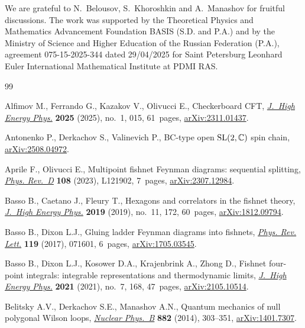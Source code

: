 \documentclass[10pt,a4paper]{amsart}
\numberwithin{equation}{section}
\begin{document}
We are grateful to N.~Belousov, S.~Khoroshkin and A.~Manashov for fruitful discussions.
The work was supported by the
Theoretical Physics and Mathematics Advancement Foundation BASIS (S.D. and P.A.) and by the Ministry of Science and Higher Education of the Russian Federation (P.A.), agreement 075-15-2025-344 dated 29/04/2025 for Saint Petersburg Leonhard Euler International Mathematical Institute at PDMI RAS.


\begin{thebibliography}{99}
\footnotesize\itemsep=0pt

Alfimov M., Ferrando G., Kazakov V., Olivucci E., Checkerboard {CFT},
 \href{https://doi.org/10.1007/jhep01(2025)015}{\textit{J.~High Energy Phys.}}
 \textbf{2025} (2025), no.~1, 015, 61~pages,
 \href{http://arxiv.org/abs/2311.01437}{arXiv:2311.01437}.

Antonenko P., Derkachov S., Valinevich P., {BC}-type open ${\rm
 SL}(2,\mathbb{C})$ spin chain,
 \href{http://arxiv.org/abs/2508.04972}{arXiv:2508.04972}.

Aprile F., Olivucci E., Multipoint fishnet {F}eynman diagrams: sequential
 splitting, \href{https://doi.org/10.1103/physrevd.108.l121902}{\textit{Phys.
 Rev.~D}} \textbf{108} (2023), L121902, 7~pages,
 \href{http://arxiv.org/abs/2307.12984}{arXiv:2307.12984}.

Basso B., Caetano J., Fleury T., Hexagons and correlators in the fishnet
 theory, \href{https://doi.org/10.1007/jhep11(2019)172}{\textit{J.~High Energy
 Phys.}} \textbf{2019} (2019), no.~11, 172, 60~pages,
 \href{http://arxiv.org/abs/1812.09794}{arXiv:1812.09794}.

Basso B., Dixon L.J., Gluing ladder {F}eynman diagrams into fishnets,
 \href{https://doi.org/10.1103/PhysRevLett.119.071601}{\textit{Phys. Rev.
 Lett.}} \textbf{119} (2017), 071601, 6~pages,
 \href{http://arxiv.org/abs/1705.03545}{arXiv:1705.03545}.

Basso B., Dixon L.J., Kosower D.A., Krajenbrink A., Zhong D., Fishnet
 four-point integrals: integrable representations and thermodynamic limits,
 \href{https://doi.org/10.1007/jhep07(2021)168}{\textit{J.~High Energy Phys.}}
 \textbf{2021} (2021), no.~7, 168, 47~pages,
 \href{http://arxiv.org/abs/2105.10514}{arXiv:2105.10514}.

Belitsky A.V., Derkachov S.E., Manashov A.N., Quantum mechanics of null
 polygonal {W}ilson loops,
 \href{https://doi.org/10.1016/j.nuclphysb.2014.03.007}{\textit{Nuclear
 Phys.~B}} \textbf{882} (2014), 303--351,
 \href{http://arxiv.org/abs/1401.7307}{arXiv:1401.7307}.


\end{thebibliography}
\end{document}
